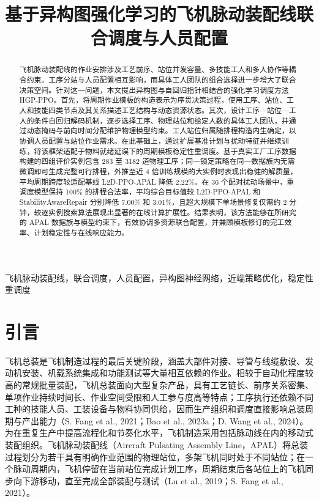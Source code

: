 \documentclass[journal,10pt]{IEEEtran}
\title{基于异构图强化学习的飞机脉动装配线联合调度与人员配置}
\author{}
\begin{document}
\maketitle

\begin{abstract}
飞机脉动装配线的作业安排涉及工艺前序、站位并发容量、多技能工人和多人协作等耦合约束。工序分站与人员配置相互影响，而具体工人团队的组合选择进一步增大了联合决策空间。针对这一问题，本文提出异构图与自回归指针相结合的强化学习调度方法 HGP-PPO。首先，将周期作业模板的构造表示为序贯决策过程，使用工序、站位、工人和技能四类节点及其关系描述工艺结构与动态资源状态。其次，设计工序---站位---工人的条件自回归解码机制，逐步选择工序、物理站位和给定人数的具体工人团队，并通过动态掩码与前向时间分配维护物理模型约束。工人站位归属随排程构造内生确定，以协调人员配置与站位作业需求。在此基础上，通过扩展基准计划与扰动特征并继续训练，将该框架适配于物料就绪延误下的周期模板稳定性重调度。基于真实工厂工序数据构建的四组评价实例包含 283 至 3182 道物理工序；同一锁定策略在同一数据族内无需微调即可生成完整可行排程，外推至近 4 倍训练规模的大实例时表现出稳健的解质量，平均周期跨度较适配基线 L2D-PPO-APAL 降低 2.22\%。在 36 个配对扰动场景中，重调度模型保持 100\% 的排程合法率，平均综合目标值较 L2D-PPO-APAL 和 StabilityAwareRepair 分别降低 7.00\% 和 3.01\%，且超大规模下单场景修复仅需约 2 分钟，较逐实例搜索算法展现出显著的在线计算扩展性。结果表明，该方法能够在所研究的 APAL 数据族与模型约束下，有效协调多资源联合配置，并兼顾模板修订的完工效率、计划稳定性与在线响应能力。
\end{abstract}

\begin{IEEEkeywords}
飞机脉动装配线，联合调度，人员配置，异构图神经网络，近端策略优化，稳定性重调度
\end{IEEEkeywords}

\section{引言}\label{ux5f15ux8a00}

飞机总装是飞机制造过程的最后关键阶段，涵盖大部件对接、导管与线缆敷设、发动机安装、机载系统集成和功能测试等大量相互依赖的作业。相较于自动化程度较高的常规批量装配，飞机总装面向大型复杂产品，具有工艺链长、前序关系密集、单项作业持续时间长、作业空间受限和人工参与度高等特点；工序执行还依赖不同工种的技能人员、工装设备与物料协同供给，因而生产组织和调度直接影响总装周期与产出能力（S. Fang et al., 2021；Bao et al., 2023a；D. Wang et al., 2024）。为在重复生产中提高流程化和节奏化水平，飞机制造采用包括脉动线在内的移动式装配组织。飞机脉动装配线（Aircraft Pulsating Assembly Line，APAL）将总装过程划分为若干具有明确作业范围的物理站位，多架飞机同时处于不同站位；在一个脉动周期内，飞机停留在当前站位完成计划工序，周期结束后各站位上的飞机同步向下游移动，直至完成全部装配与测试（Lu et al., 2019；S. Fang et al., 2021）。
\end{document}
